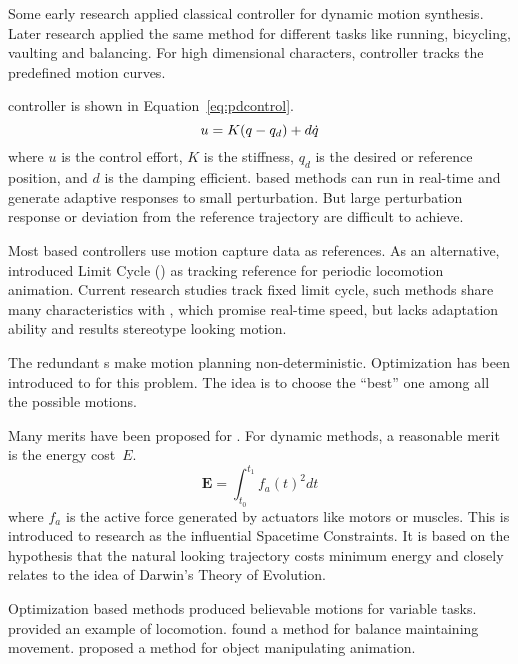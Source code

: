 \begin{itemize}




Some early research applied classical \pd controller \citep{Raibert1991} for dynamic motion synthesis.
Later research \citep{Hodgins1995} applied the same method for different tasks like running, bicycling, vaulting and balancing. 
For high dimensional characters, \pd controller tracks the predefined motion curves\citep{Yin2007}.

\pd controller is shown in Equation~\ref{eq:pdcontrol}.
\begin{equation}
\label{eq:pdcontrol}
u=K(q -q_d)+d\dot{q}
\end{equation}
where $u$ is the control effort, $K$ is the stiffness, $q_d$ is the desired or reference position, and $d$ is the damping efficient.
\pd based methods can run in real-time and generate adaptive responses to small perturbation.
But large perturbation response or deviation from the reference trajectory are difficult to achieve.


Most \pd based controllers use motion capture data as references.
As an alternative, \citet{Laszlo1996} introduced Limit Cycle (\lc) as tracking reference for periodic locomotion animation. 
Current research studies\citep{Coros2009,coros2010generalized,Laszlo1996} track fixed limit cycle,
such methods share many characteristics with \pd, which promise real-time speed, but lacks adaptation ability and results stereotype looking motion.







The redundant \dof s make motion planning non-deterministic.
Optimization has been introduced to \cms for this problem.
The idea is to choose the ``best'' one among all the possible motions.

Many merits have been proposed for \cms.
For dynamic methods, a reasonable merit is the energy cost~$E$. 
\begin{equation}
 \textbf{E}=\int_{t_0}^{t_1}f_{a}(t)^2dt
\end{equation}
where $f_{a}$ is the active force generated by actuators like motors or muscles. 
This is introduced to \cms research as the influential Spacetime Constraints\citep{Witkin1988}. 
It is based on the hypothesis that the natural looking trajectory costs minimum energy 
and closely relates to the idea of Darwin's Theory of Evolution. 

Optimization based  methods produced believable motions for variable tasks. 
\citet{Jain2009} provided an example of locomotion.  
\citet{BalanceControl} found a method for balance maintaining movement. 
\citet{Liu2009} proposed a method for object manipulating animation. 
\end{itemize}


